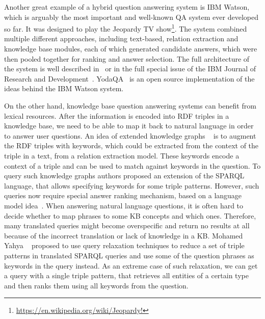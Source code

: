 Another great example of a hybrid question answering system is IBM Watson, which is arguably the most important and well-known QA system ever developed so far.
It was designed to play the Jeopardy TV show\footnote{\href{url}{https://en.wikipedia.org/wiki/Jeopardy!}}.
The system combined multiple different approaches, including text-based, relation extraction and knowledge base modules, each of which generated candidate answers, which were then pooled together for ranking and answer selection.
The full architecture of the system is well described in~\cite{ferrucci2010building} or in the full special issue of the IBM Journal of Research and Development~\cite{ibm_watson_special_issue}.
YodaQA~\cite{baudivs2015yodaqa} is an open source implementation of the ideas behind the IBM Watson system.

On the other hand, knowledge base question answering systems can benefit from lexical resources.
After the information is encoded into RDF triples in a knowledge base, we need to be able to map it back to natural language in order to answer user questions.
An idea of extended knowledge graphs ~\cite{elbassuoni2009language,yahya2013robust} is to augment the RDF triples with keywords, which could be extracted from the context of the triple in a text, \eg from a relation extraction model.
These keywords encode a context of a triple and can be used to match against keywords in the question.
To query such knowledge graphs authors proposed an extension of the SPARQL language, that allows specifying keywords for some triple patterns.
However, such queries now require special answer ranking mechanism, \eg based on a language model idea~\cite{elbassuoni2009language}.
When answering natural language questions, it is often hard to decide whether to map phrases to some KB concepts and which ones.
Therefore, many translated queries might become overspecific and return no results at all because of the incorrect translation or lack of knowledge in a KB.
Mohamed Yahya \etal~\cite{yahya2013robust,yahya2016relationship} proposed to use query relaxation techniques to reduce a set of triple patterns in translated SPARQL queries and use some of the question phrases as keywords in the query instead.
As an extreme case of such relaxation, we can get a query with a single triple pattern, that retrieves all entities of a certain type and then ranks them using all keywords from the question.

